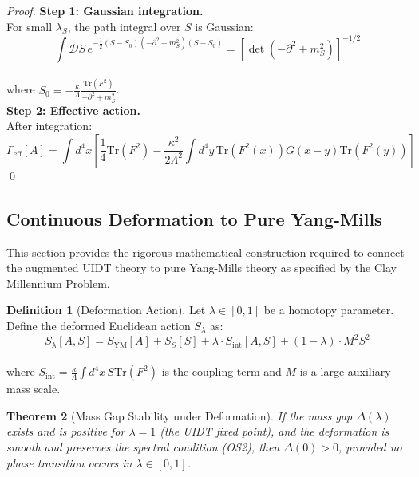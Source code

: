 \documentclass[11pt,a4paper]{article}
\renewcommand{\Tr}{\mathrm{Tr}}
\theoremstyle{plain}
\newtheorem{theorem}{Theorem}[section]
\theoremstyle{definition}
\newtheorem{definition}[theorem]{Definition}
\begin{document}
\begin{proof}
\textbf{Step 1: Gaussian integration.}
\vspace{0.3em}\\
For small $\lambda_S$, the path integral over $S$ is Gaussian:
\begin{equation}
\int\mathcal{D}S\, e^{-\frac{1}{2}(S-S_0)(-\partial^2+m_S^2)(S-S_0)}
= [\det(-\partial^2 + m_S^2)]^{-1/2}
\end{equation}\vspace{0.3em}\\
where $S_0 = -\frac{\kappa}{\Lambda}\frac{\Tr(F^2)}{-\partial^2 + m_S^2}$.
\vspace{0.8em}\\
\textbf{Step 2: Effective action.}
\vspace{0.5em}\\
After integration:
\begin{equation}
\Gamma_{\mathrm{eff}}[A] = \int d^4x\left[\frac{1}{4}\Tr(F^2)
- \frac{\kappa^2}{2\Lambda^2}\int d^4y\, \Tr(F^2(x))G(x-y)\Tr(F^2(y))\right]
\end{equation}
\qed
\end{proof}

\subsection{Continuous Deformation to Pure Yang-Mills}

This section provides the rigorous mathematical construction required to connect the augmented UIDT theory to pure Yang-Mills theory as specified by the Clay Millennium Problem.

\begin{definition}[Deformation Action]
\label{def:deformation_action}
Let $\lambda \in [0, 1]$ be a homotopy parameter. Define the deformed Euclidean action $S_\lambda$ as:
\begin{equation}
S_\lambda[A, S] = S_{\mathrm{YM}}[A] + S_S[S] + \lambda \cdot S_{\mathrm{int}}[A, S]
+ (1-\lambda) \cdot M^2 S^2
\label{eq:deformation_action}
\end{equation}\vspace{0.1em}\\
where $S_{\mathrm{int}} = \frac{\kappa}{\Lambda} \int d^4x\, S \Tr(F^2)$ is the coupling term and $M$ is a large auxiliary mass scale.
\end{definition}

\begin{theorem}[Mass Gap Stability under Deformation]
\label{thm:gap_stability}
If the mass gap $\Delta(\lambda)$ exists and is positive for $\lambda = 1$ (the UIDT fixed point), and the deformation is smooth and preserves the spectral condition (OS2), then $\Delta(0) > 0$, provided no phase transition occurs in $\lambda \in [0, 1]$.
\end{theorem}
\end{document}
